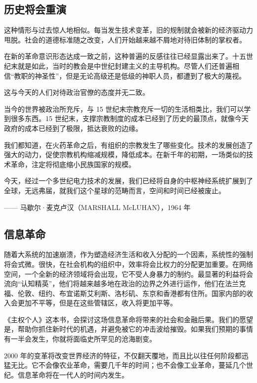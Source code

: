 \subsection{历史将会重演}
这种情形与过去惊人地相似。每当发生技术变革，旧的规制就会被新的经济驱动力甩脱。社会的道德标准随之改变，人们开始越来越不屑地对待旧体制的掌权者。


在新的革命意识形态达成一致之前，这种普遍的反感往往已经显露出来了。十五世纪末就是如此，当时的教会是中世纪封建主义的主导机构。尽管人们还普遍相信“教职的神圣性”，但是无论高级还是低级的神职人员，都遭到了极大的蔑视。


这与今天的人们对待政治官僚的态度并无二致。


当今的世界被政治所充斥，与 15 世纪末宗教充斥一切的生活相类比，我们可以学到很多东西。15 世纪末，支撑宗教制度的成本已经到了历史的最顶点，就像今天政府的成本已经到了极限，抵达衰败的边缘。


我们都知道，在火药革命之后，有组织的宗教发生了哪些变化。技术的发展创造了强大的动力，促使宗教机构缩减规模，降低成本。在新千年的初期，一场类似的技术革命，注定将彻底缩小民族国家的规模。



\begin{tcolorbox}
今天，经过一个多世纪电力技术的发展，我们已经将自身的中枢神经系统扩展到了全球，无远弗届，就我们这个星球的范畴而言，空间和时间已经被废止。
\begin{flushright}
—— 马歇尔·麦克卢汉（MARSHALL McLUHAN），1964 年
\end{flushright}
\end{tcolorbox}

\subsection{信息革命}
随着大系统的加速崩溃，作为塑造经济生活和收入分配的一个因素，系统性的强制将会式微。很快，在社会机构的组织中，效率将会比权力的分配更加重要。在网络空间，一个全新的经济领域将会出现，它不受人身暴力的制约。最显著的利益将会流向“认知精英”，他们将越来越多地在政治的边界之外进行运作，他们在法兰克福、伦敦、纽约、布宜诺斯艾利斯、洛杉矶、东京和香港都有住所。国家内部的收入会更加不平等，但是在这些管辖区，收入将更加平等。

《主权个人》这本书，会探讨这场信息革命将带来的社会和金融后果。我们的愿望是，帮助你抓住新时代的机遇，并避免被它的冲击波给摧毁。如果我们预期的事情有一半会发生，你就将面临史所罕见的沧海剧变。


2000 年的变革将改变世界经济的特征，不仅翻天覆地，而且比以往任何阶段都迅猛无比。它不会像农业革命，需要几千年的时间；也不会像工业革命，蔓延几个世纪。信息革命将在一代人的时间内发生。

